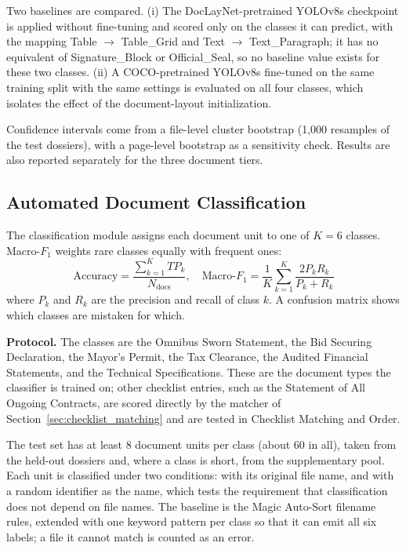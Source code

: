 Two baselines are compared. (i) The DocLayNet-pretrained YOLOv8s checkpoint is applied without fine-tuning and scored only on the classes it can predict, with the mapping Table $\to$ Table\_Grid and Text $\to$ Text\_Paragraph; it has no equivalent of Signature\_Block or Official\_Seal, so no baseline value exists for these two classes. (ii) A COCO-pretrained YOLOv8s fine-tuned on the same training split with the same settings is evaluated on all four classes, which isolates the effect of the document-layout initialization.

Confidence intervals come from a file-level cluster bootstrap (1,000 resamples of the test dossiers), with a page-level bootstrap as a sensitivity check. Results are also reported separately for the three document tiers.

\subsection{Automated Document Classification}
\label{sec:eval_doc_classification}

The classification module assigns each document unit to one of $K=6$ classes. Macro-$F_1$ weights rare classes equally with frequent ones:
\begin{equation}
\label{eq:macro_f1}
\text{Accuracy}=\frac{\sum_{k=1}^{K}TP_k}{N_{\mathrm{docs}}},\quad
\text{Macro-}F_1 = \frac{1}{K} \sum_{k=1}^K \frac{2P_kR_k}{P_k+R_k}
\end{equation}
where $P_k$ and $R_k$ are the precision and recall of class $k$. A confusion matrix shows which classes are mistaken for which.

\textbf{Protocol.} The classes are the Omnibus Sworn Statement, the Bid Securing Declaration, the Mayor's Permit, the Tax Clearance, the Audited Financial Statements, and the Technical Specifications. These are the document types the classifier is trained on; other checklist entries, such as the Statement of All Ongoing Contracts, are scored directly by the matcher of Section~\ref{sec:checklist_matching} and are tested in Checklist Matching and Order.

The test set has at least 8 document units per class (about 60 in all), taken from the held-out dossiers and, where a class is short, from the supplementary pool. Each unit is classified under two conditions: with its original file name, and with a random identifier as the name, which tests the requirement that classification does not depend on file names. The baseline is the Magic Auto-Sort filename rules, extended with one keyword pattern per class so that it can emit all six labels; a file it cannot match is counted as an error.

